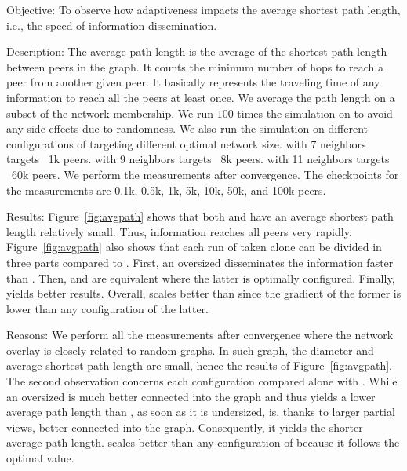 \begin{asparadesc}
\item[Objective:] To observe how adaptiveness impacts the average shortest path
  length, i.e., the speed of information dissemination.
\item[Description:] The average path length is the average of the shortest path
  length between peers in the graph. It counts the minimum number of hops to
  reach a peer from another given peer. It basically represents the traveling
  time of any information to reach all the peers at least once. We average the
  path length on a subset of the network membership. We run $100$ times the
  simulation on \SPRAY to avoid any side effects due to randomness. We also run
  the simulation on different configurations of \CYCLON targeting different
  optimal network size. \CYCLON with 7 neighbors targets ~1k peers. \CYCLON with
  9 neighbors targets ~8k peers. \CYCLON with 11 neighbors targets ~60k
  peers. We perform the measurements after convergence. The checkpoints for the
  measurements are 0.1k, 0.5k, 1k, 5k, 10k, 50k, and 100k peers.
\item[Results:] Figure~\ref{fig:avgpath} shows that both \CYCLON and \SPRAY have
  an average shortest path length relatively small. Thus, information reaches
  all peers very rapidly. Figure~\ref{fig:avgpath} also shows that each run of
  \CYCLON taken alone can be divided in three parts compared to \SPRAY. First,
  an oversized \CYCLON disseminates the information faster than \SPRAY. Then,
  \SPRAY and \CYCLON are equivalent where the latter is optimally
  configured. Finally, \SPRAY yields better results. Overall, \SPRAY scales
  better than \CYCLON since the gradient of the former is lower than any
  configuration of the latter.
\item[Reasons:] We perform all the measurements after convergence where the
  network overlay is closely related to random graphs. In such graph, the
  diameter and average shortest path length are small, hence the results of
  Figure~\ref{fig:avgpath}. The second observation concerns each \CYCLON
  configuration compared alone with \SPRAY. While an oversized \CYCLON is much
  better connected into the graph and thus yields a lower average path length
  than \SPRAY, as soon as it is undersized, \SPRAY is, thanks to larger partial
  views, better connected into the graph.  Consequently, it yields the shorter
  average path length. \SPRAY scales better than any configuration of \CYCLON
  because it follows the optimal value.
\end{asparadesc}

